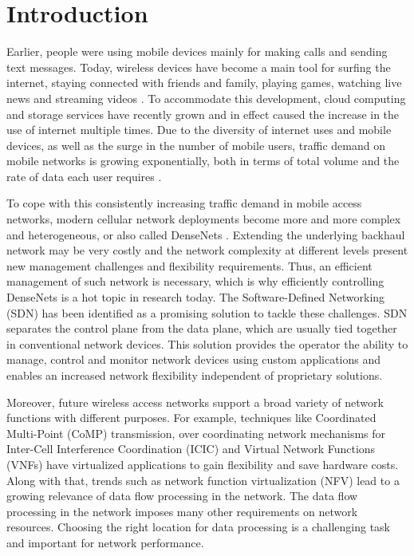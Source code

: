 
\chapter{Introduction}\label{INTR-CHAP}
Earlier, people were using mobile devices mainly for making calls and sending text messages. Today, wireless devices have become a main tool for surfing the internet, staying connected with friends and family, playing games, watching live news and streaming videos \cite{6146489}. To accommodate this development, cloud computing and storage services have recently grown and in effect caused the increase in the use of internet multiple times. Due to the diversity of internet uses and mobile devices, as well as the surge in the number of mobile users, traffic demand on mobile networks is growing exponentially, both in terms of total volume and the rate of data each user requires \cite{icsssti}. 

To cope with this consistently increasing traffic demand in mobile access networks, modern cellular network deployments become more and more complex and heterogeneous, or also called DenseNets \cite{6146489}. Extending the underlying backhaul network may be very costly and the network complexity at different levels present new management challenges and flexibility requirements. Thus, an efficient management of such network is necessary, which is why efficiently controlling DenseNets is a hot topic in research today. The Software-Defined Networking (SDN) has been identified as a promising solution to tackle these challenges. SDN separates the control plane from the data plane, which are usually tied together in conventional network devices. This solution provides the operator the ability to manage, control and monitor network devices using custom applications and enables an increased network flexibility independent of proprietary solutions.

Moreover, future wireless access networks support a broad variety of network functions with different purposes. For example, techniques like Coordinated Multi-Point (CoMP) \cite{comp} transmission, over coordinating network mechanisms for Inter-Cell Interference Coordination (ICIC) and Virtual Network Functions (VNFs) have virtualized applications to gain flexibility and save hardware costs. Along with that, trends such as network function virtualization (NFV) \cite{DBLP:journals/corr/MijumbiSGBTB15} lead to a growing relevance of data flow processing in the network. The data flow processing in the network imposes many other requirements on network resources. Choosing the right location for data processing is a challenging task and important for network performance.

